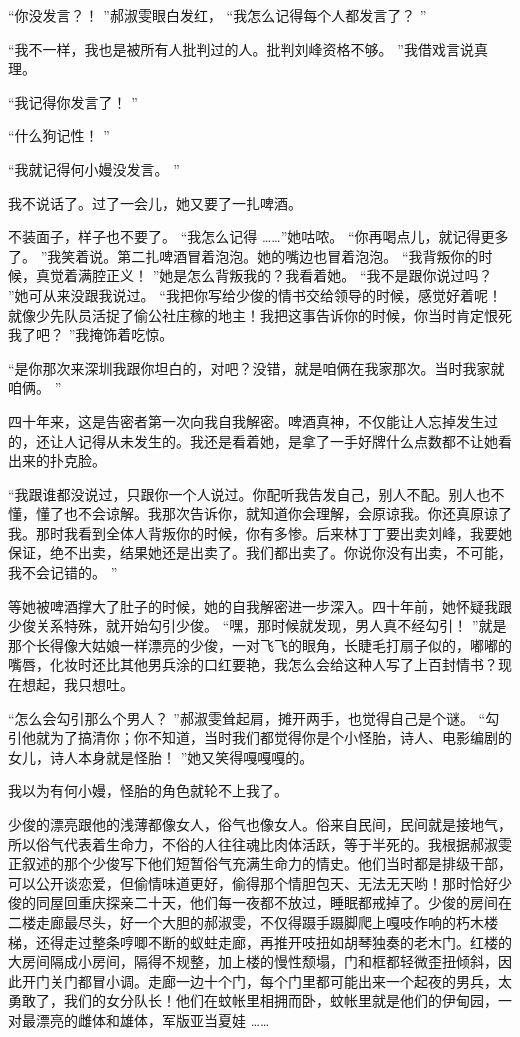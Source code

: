 \documentclass[12pt,twoside,openany]{book}
\begin{document}
“你没发言？！ ”郝淑雯眼白发红， “我怎么记得每个人都发言了？ ”

“我不一样，我也是被所有人批判过的人。批判刘峰资格不够。 ”我借戏言说真理。

“我记得你发言了！ ”

“什么狗记性！ ”

“我就记得何小嫚没发言。 ”

我不说话了。过了一会儿，她又要了一扎啤酒。

不装面子，样子也不要了。 “我怎么记得 ……”她咕哝。 “你再喝点儿，就记得更多了。 ”我笑着说。第二扎啤酒冒着泡泡。她的嘴边也冒着泡泡。 “我背叛你的时候，真觉着满腔正义！ ”她是怎么背叛我的？我看着她。 “我不是跟你说过吗？ ”她可从来没跟我说过。 “我把你写给少俊的情书交给领导的时候，感觉好着呢！就像少先队员活捉了偷公社庄稼的地主！我把这事告诉你的时候，你当时肯定恨死我了吧？ ”我掩饰着吃惊。

“是你那次来深圳我跟你坦白的，对吧？没错，就是咱俩在我家那次。当时我家就咱俩。 ”

四十年来，这是告密者第一次向我自我解密。啤酒真神，不仅能让人忘掉发生过的，还让人记得从未发生的。我还是看着她，是拿了一手好牌什么点数都不让她看出来的扑克脸。

“我跟谁都没说过，只跟你一个人说过。你配听我告发自己，别人不配。别人也不懂，懂了也不会谅解。我那次告诉你，就知道你会理解，会原谅我。你还真原谅了我。那时我看到全体人背叛你的时候，你有多惨。后来林丁丁要出卖刘峰，我要她保证，绝不出卖，结果她还是出卖了。我们都出卖了。你说你没有出卖，不可能，我不会记错的。 ”

等她被啤酒撑大了肚子的时候，她的自我解密进一步深入。四十年前，她怀疑我跟少俊关系特殊，就开始勾引少俊。 “嘿，那时候就发现，男人真不经勾引！ ”就是那个长得像大姑娘一样漂亮的少俊，一对飞飞的眼角，长睫毛打扇子似的，嘟嘟的嘴唇，化妆时还比其他男兵涂的口红要艳，我怎么会给这种人写了上百封情书？现在想起，我只想吐。

“怎么会勾引那么个男人？ ”郝淑雯耸起肩，摊开两手，也觉得自己是个谜。 “勾引他就为了搞清你；你不知道，当时我们都觉得你是个小怪胎，诗人、电影编剧的女儿，诗人本身就是怪胎！ ”她又笑得嘎嘎嘎的。

我以为有何小嫚，怪胎的角色就轮不上我了。

少俊的漂亮跟他的浅薄都像女人，俗气也像女人。俗来自民间，民间就是接地气，所以俗气代表着生命力，不俗的人往往魂比肉体活跃，等于半死的。我根据郝淑雯正叙述的那个少俊写下他们短暂俗气充满生命力的情史。他们当时都是排级干部，可以公开谈恋爱，但偷情味道更好，偷得那个情胆包天、无法无天哟！那时恰好少俊的同屋回重庆探亲二十天，他们每一夜都不放过，睡眠都戒掉了。少俊的房间在二楼走廊最尽头，好一个大胆的郝淑雯，不仅得蹑手蹑脚爬上嘎吱作响的朽木楼梯，还得走过整条哼唧不断的蚁蛀走廊，再推开吱扭如胡琴独奏的老木门。红楼的大房间隔成小房间，隔得不规整，加上楼的慢性颓塌，门和框都轻微歪扭倾斜，因此开门关门都冒小调。走廊一边十个门，每个门里都可能出来一个起夜的男兵，太勇敢了，我们的女分队长！他们在蚊帐里相拥而卧，蚊帐里就是他们的伊甸园，一对最漂亮的雌体和雄体，军版亚当夏娃 ……
\end{document}

